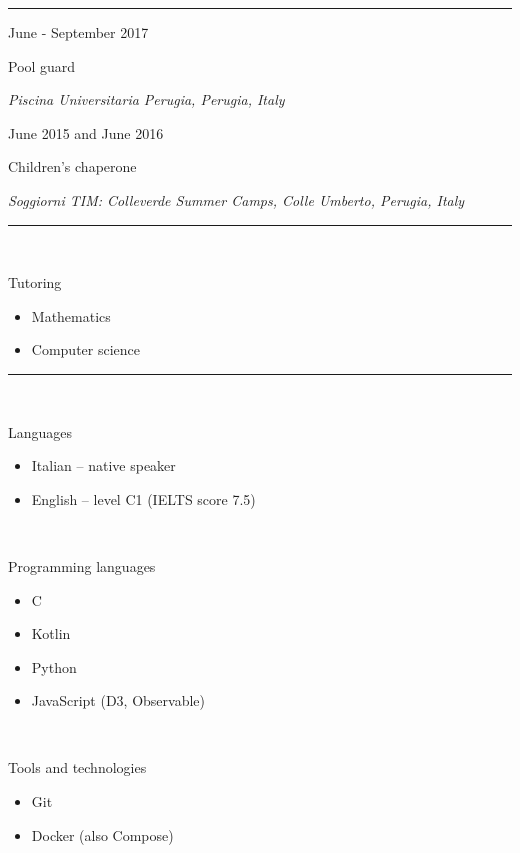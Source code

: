 \documentclass[a4paper,10pt]{article}
\newlength{\cvcolumngapwidth}
\newlength{\cvleftcolumnwidth}
\newlength{\cvrightcolumnwidth}
\newcommand{\cvsectionstyle}[1]{{\normalsize\cvsectionfont\textcolor{cvsectioncolor}{#1}}}
\newcommand{\cvtitlestyle}[1]{{\large\cvtitlefont\textcolor{cvtitlecolor}{#1}}}
\newcommand{\cvdurationstyle}[1]{{\small\cvdurationfont\textcolor{cvdurationcolor}{#1}}}
\newcommand{\cvheadingstyle}[1]{{\normalsize\cvheadingfont\textcolor{cvheadingcolor}{#1}}}
\newlength{\cvafteritemskipamount}
\newlength{\cvaftersectionskipamount}
\newlength{\cvbetweensectionandheadingextraskipamount}
\newlength{\cvaftertitleskipamount}
\newlength{\cvparskip}
\newcommand{\cvsection}[1]{
    \begin{minipage}[t]{\cvleftcolumnwidth}
        \raggedleft\cvsectionstyle{#1}
    \end{minipage}%
    \hspace{\cvcolumngapwidth}%
    \begin{minipage}[t]{\cvrightcolumnwidth}
        \textcolor{cvrulecolor}{\rule{\cvrightcolumnwidth}{0.3mm}}
    \end{minipage}

    \vspace{\cvaftersectionskipamount}
}
\newcommand{\cvitem}[2]{
    \begin{minipage}[t]{\cvleftcolumnwidth}
        \raggedleft #1
    \end{minipage}%
    \hspace{\cvcolumngapwidth}%
    \begin{minipage}[t]{\cvrightcolumnwidth}
        \setlength{\parskip}{\cvparskip} #2
    \end{minipage}

    \vspace{\cvafteritemskipamount}
}
\newcommand{\cvtitle}[1]{
    \cvtitlestyle{#1}

    \vspace{\cvaftertitleskipamount}
    \vspace{-\cvparskip}
}
\begin{document}

\cvsection{WORK EXPERIENCE}

\cvitem{
    \cvdurationstyle{June - September 2017}
}{
    \cvtitle{Pool guard}
    
    \textit{Piscina Universitaria Perugia, Perugia, Italy}
}

\cvitem{
    \cvdurationstyle{June 2015 and June 2016}
}{
    \cvtitle{Children's chaperone}

    \textit{Soggiorni TIM: Colleverde Summer Camps, Colle Umberto, Perugia, Italy}
}



\cvsection{OTHER EXPERIENCES}

\cvitem{
    \ 
}{
    \cvheadingstyle{Tutoring}
    \begin{itemize}[leftmargin=*]
        \item Mathematics
        \item Computer science
    \end{itemize}
}


\cvsection{SKILLS}

\vspace{\cvbetweensectionandheadingextraskipamount}

\cvitem{
    \ 
}{
    \cvheadingstyle{Languages}
    \begin{itemize}[leftmargin=*]
        \item Italian -- native speaker
        \item English -- level C1 (IELTS score 7.5)
    \end{itemize}
    
}

\cvitem{
    \ 
}{
    \cvheadingstyle{Programming languages}
    \begin{itemize}[leftmargin=*]
        \item C
        \item Kotlin
        \item Python
        \item JavaScript (D3, Observable)
    \end{itemize}

}

\cvitem{
    \ 
}{
    \cvheadingstyle{Tools and technologies}
    \begin{itemize}[leftmargin=*]
        \item Git
        \item Docker (also Compose)
    \end{itemize}    
}
\end{document}
